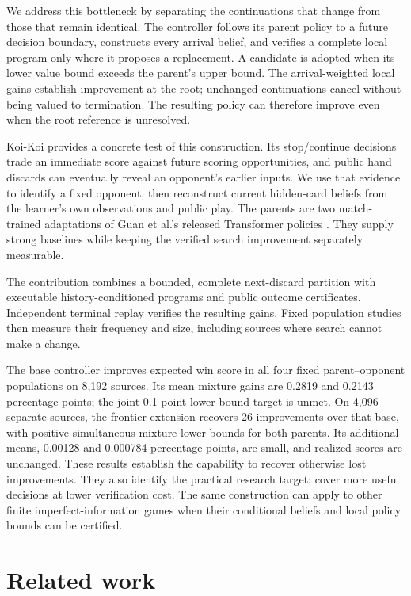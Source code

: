 \documentclass[11pt]{article}
\begin{document}
We address this bottleneck by separating the continuations that change from
those that remain identical. The controller follows its parent policy to a
future decision boundary, constructs every arrival belief, and verifies a
complete local program only where it proposes a replacement. A candidate is
adopted when its lower value bound exceeds the parent's upper bound. The
arrival-weighted local gains establish improvement at the root; unchanged
continuations cancel without being valued to termination. The resulting
policy can therefore improve even when the root reference is unresolved.

Koi-Koi provides a concrete test of this construction. Its stop/continue
decisions trade an immediate score against future scoring opportunities, and
public hand discards can eventually reveal an opponent's earlier inputs.
We use that evidence to identify a fixed opponent, then reconstruct current
hidden-card beliefs from the learner's own observations and public play.
The parents are two match-trained adaptations of Guan et al.'s released
Transformer policies \cite{guan2023koikoi,pinnedkoikoi}. They supply strong
baselines while keeping the verified search improvement separately measurable.

The contribution combines a bounded, complete next-discard partition with
executable history-conditioned programs and public outcome certificates.
Independent terminal replay verifies the resulting gains. Fixed population
studies then measure their frequency and size, including sources where search
cannot make a change.

The base controller improves expected win score in all four fixed
parent--opponent populations on 8,192 sources. Its mean mixture gains are
0.2819 and 0.2143 percentage points; the joint 0.1-point lower-bound target
is unmet. On 4,096 separate sources, the frontier extension recovers 26
improvements over that base, with positive simultaneous mixture lower bounds
for both parents. Its additional means, 0.00128 and 0.000784 percentage points,
are small, and realized scores are unchanged. These results establish the
capability to recover otherwise lost improvements. They also identify the
practical research target: cover more useful decisions at lower verification
cost. The same construction can apply to other finite imperfect-information
games when their conditional beliefs and local policy bounds can be certified.

\section{Related work}
\end{document}
